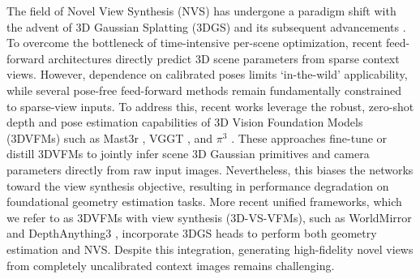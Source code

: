 The field of Novel View Synthesis (NVS) has undergone a paradigm shift with the advent of 3D Gaussian Splatting (3DGS) \cite{kerbl20233d} and its subsequent advancements \cite{Wu_2024_CVPR, park2024splinegs, lin2025longsplat, bui2025mobgsmotiondeblurringdynamic, fu2024colmap, yu2024mip}. 
To overcome the bottleneck of time-intensive per-scene optimization, recent feed-forward architectures \cite{charatan2024pixelsplat, chen2024mvsplat, xu2025depthsplat, ziwen2025long} directly predict 3D scene parameters from sparse context views. 
However, dependence on calibrated poses limits `in-the-wild' applicability, while several pose-free feed-forward methods \cite{hong2023unifying, smart2024splatt3r,kang2025selfsplat, zhang2025flarefeedforwardgeometryappearance} remain fundamentally constrained to sparse-view inputs. 
To address this, recent works \cite{ye2024no, huang2025no, park2026ecosplat, jiang2025anysplat, ye2026yonosplat} leverage the robust, zero-shot depth and pose estimation capabilities of 3D Vision Foundation Models (3DVFMs) such as Mast3r \cite{mast3r_eccv24}, VGGT \cite{wang2025vggt}, and $\pi^3$ \cite{wang2025pi3}. 
These approaches fine-tune or distill 3DVFMs to jointly infer scene 3D Gaussian primitives and camera parameters directly from raw input images. 
Nevertheless, this biases the networks toward the view synthesis objective, resulting in performance degradation on foundational geometry estimation tasks. 
More recent unified frameworks, which we refer to as 3DVFMs with view synthesis (3D-VS-VFMs), such as WorldMirror \cite{liu2025worldmirror} and DepthAnything3 \cite{lin2025da3}, incorporate 3DGS heads to perform both geometry estimation and NVS. 
Despite this integration, generating high-fidelity novel views from completely uncalibrated context images remains challenging.

